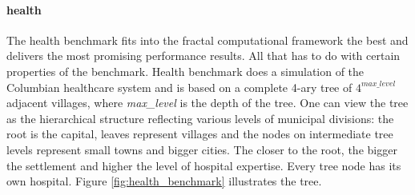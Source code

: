 \paragraph{health} The health benchmark fits into the fractal computational framework the best and delivers the most promising performance results. All that has to do with certain properties of the benchmark. Health benchmark does a simulation of the Columbian healthcare system and is based on a complete 4-ary tree of $4^{max\_level}$ adjacent villages, where \textit{max\_level} is the depth of the tree. One can view the tree as the hierarchical structure reflecting various levels of municipal divisions: the root is the capital, leaves represent villages and the nodes on intermediate tree levels represent small towns and bigger cities. The closer to the root, the bigger the settlement and higher the level of hospital expertise. Every tree node has its own hospital. Figure \ref{fig:health_benchmark} illustrates the tree.
